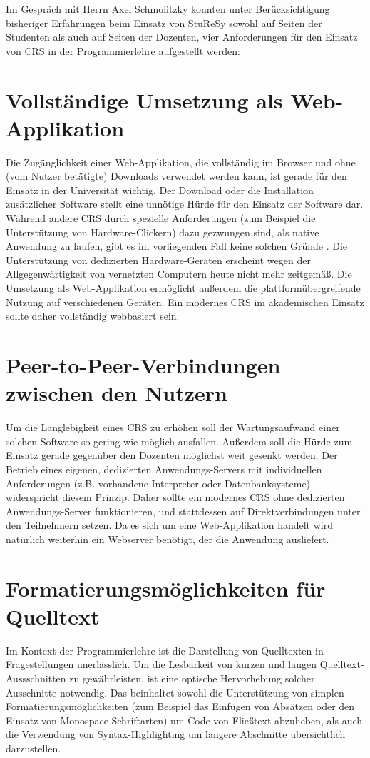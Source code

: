 Im Gespräch mit Herrn Axel Schmolitzky konnten unter Berücksichtigung bisheriger Erfahrungen beim Einsatz von StuReSy sowohl auf Seiten der Studenten als auch auf Seiten der Dozenten, vier Anforderungen für den Einsatz von CRS in der Programmierlehre aufgestellt werden:

\section{Vollständige Umsetzung als Web-Applikation}
\label{chap:webbasiert}
Die Zugänglichkeit einer Web-Applikation, die vollständig im Browser und ohne (vom Nutzer betätigte) Downloads verwendet werden kann, ist gerade für den Einsatz in der Universität wichtig. Der Download oder die Installation zusätzlicher Software stellt eine unnötige Hürde für den Einsatz der Software dar. Während andere CRS durch spezielle Anforderungen (zum Beispiel die Unterstützung von Hardware-Clickern) dazu gezwungen sind, als native Anwendung zu laufen, gibt es im vorliegenden Fall keine solchen Gründe . Die Unterstützung von dedizierten Hardware-Geräten erscheint wegen der Allgegenwärtigkeit von vernetzten Computern heute nicht mehr zeitgemäß. Die Umsetzung als Web-Applikation ermöglicht außerdem die plattformübergreifende Nutzung auf verschiedenen Geräten. Ein modernes CRS im akademischen Einsatz sollte daher vollständig webbasiert sein.

\section{Peer-to-Peer-Verbindungen zwischen den Nutzern}
\label{chap:anforderung_p2p}
Um die Langlebigkeit eines CRS zu erhöhen soll der Wartungsaufwand einer solchen Software so gering wie möglich ausfallen. Außerdem soll die Hürde zum Einsatz gerade gegenüber den Dozenten möglichst weit gesenkt werden. Der Betrieb eines eigenen, dedizierten Anwendungs-Servers mit individuellen Anforderungen (z.B. vorhandene Interpreter oder Datenbanksysteme) widerspricht diesem Prinzip. Daher sollte ein modernes CRS ohne dedizierten Anwendungs-Server funktionieren, und stattdessen auf Direktverbindungen unter den Teilnehmern setzen. Da es sich um eine Web-Applikation handelt wird natürlich weiterhin ein Webserver benötigt, der die Anwendung ausliefert.

\section{Formatierungsmöglichkeiten für Quelltext}
\label{chap:codeformatierung}
Im Kontext der Programmierlehre ist die Darstellung von Quelltexten in Fragestellungen unerlässlich. Um die Lesbarkeit von kurzen und langen Quelltext-Aussschnitten zu gewährleisten, ist eine optische Hervorhebung solcher Ausschnitte notwendig. 
Das beinhaltet sowohl die Unterstützung von simplen Formatierungsmöglichkeiten (zum Beispiel das Einfügen von Absätzen oder den Einsatz von Monospace-Schriftarten) um Code von Fließtext abzuheben, als auch die Verwendung von Syntax-Highlighting um längere Abschnitte übersichtlich darzustellen. 

